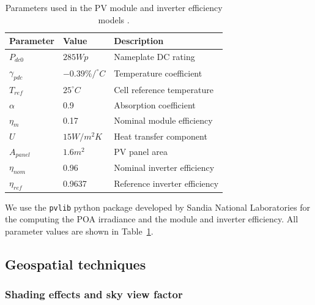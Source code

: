 \begin{table}[htbp]
\centering
\footnotesize
\caption{Parameters used in the PV module and inverter efficiency models \cite{dobos_pvwatts_2014, faiman_assessing_2008}.}
\label{tab:efficiency}

    \begin{tabular}{lll}
    \hline
    \textbf{Parameter} & \textbf{Value}     & \textbf{Description}          \\ \hline
    $P_{dc0}$          & $285 Wp$           & Nameplate DC rating           \\
    $\gamma_{pdc}$     & $-0.39\%/ ^\circ C$& Temperature coefficient       \\
    $T_{ref}$          & $25^\circ C$       & Cell reference temperature    \\
    $\alpha$           & 0.9                & Absorption coefficient        \\
    $\eta_m$           & 0.17               & Nominal module efficiency     \\
    $U$                & $15 W/m^2K$        & Heat transfer component       \\
    $A_{panel}$        & $1.6 m^2$          & PV panel area                 \\
    $\eta_{nom}$       & 0.96               & Nominal inverter efficiency   \\
    $\eta_{ref}$       & 0.9637             & Reference inverter efficiency \\ \hline
    \end{tabular}
\end{table}

We use the \texttt{pvlib} python package developed by Sandia National Laboratories \cite{holmgren_pvlib_2018} for the computing the POA irradiance and the module and inverter efficiency. All parameter values are shown in Table~\ref{tab:efficiency}.

\subsection{Geospatial techniques}
\label{GIS_methods}

\subsubsection{Shading effects and sky view factor}

